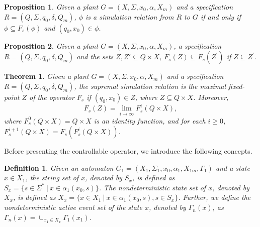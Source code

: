 \documentclass[12pt,draftcls,onecolumn]{IEEEtran}
\newtheorem{Theorem}{Theorem}
\newtheorem{Proposition}{Proposition}
\newtheorem{Definition}{Definition}
\begin{document}
\begin{Proposition}\label{ss}
Given a plant $G =(X,\Sigma,x_{0},\alpha,X_{m})$ and a specification
$R =(Q,\Sigma,q_{0},\delta,Q_{m})$, $\phi$ is a simulation relation
from $R$ to $G$ if and only if $\phi \subseteq F_s(\phi)$ and $(q_0,
x_0) \in \phi$.
\end{Proposition}

\begin{Proposition}\label{sm}
Given a plant $G =(X,\Sigma,x_{0},\alpha,X_{m})$, a specification
$R =(Q,\Sigma,q_{0},\delta,Q_{m})$ and the sets $Z, Z' \subseteq Q
\times X$, $F_s(Z) \subseteq F_s(Z ^{'})$ if $Z \subseteq Z ^{'}$.
\end{Proposition}

















\begin{Theorem} \label{st}
Given a plant $G =(X,\Sigma,x_{0},\alpha,X_{m})$ and a
specification $R =(Q,\Sigma,q_{0},\delta,Q_{m})$, the supremal
simulation relation is the maximal fixed-point $Z$ of the operator
$F_s$ if $(q_0, x_0) \in Z$, where $Z \subseteq Q \times X$.
Moreover,
\[
F_s(Z) = \lim_ {i \rightarrow \infty}F_s^{i}(Q \times X),
\]
where $F_s^{0}(Q \times X) = Q \times X$ is an identity function,
and for each $i \geq 0$, $F_s^{i+1}(Q \times X) = F_s(F_s^{i}(Q
\times X))$.
\end{Theorem}






Before presenting the controllable operator, we introduce the
following concepts.
\begin{Definition}
Given an automaton $G_1 =(X_1,\Sigma_1,x_{0},\alpha_1,X_{1m},
\Gamma_1)$ and a state $x \in X_1$, the string set of $x$, denoted
by $S_{x}$, is defined as $S_{x}=\{s \in \Sigma^{*} ~|~ x \in
\alpha_1(x_0, s)\}$. The nondeterministic state set of $x$, denoted
by $X_{x}$, is defined as $X_{x}=\{ x \in X_1 ~|~ x \in
\alpha_1(x_0, s), s \in S_{x}\}$. Further, we define the
nondeterministic active event set of the state $x$, denoted by
$\Gamma_{n}(x)$, as $\Gamma_{n}(x) = \cup_{x_1 \in
X_{x}}\Gamma_1(x_1)$.
\end{Definition}
\end{document}

